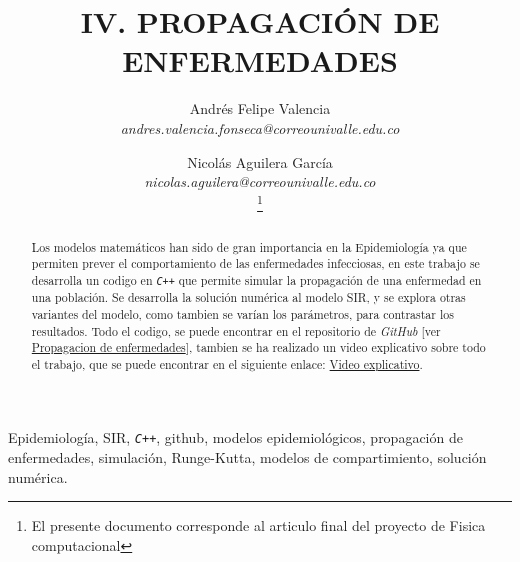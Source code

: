 \documentclass[journal]{IEEEtran}
\begin{document}
\title{IV. PROPAGACIÓN DE ENFERMEDADES}
\author{Andrés Felipe Valencia \\
	\textit{andres.valencia.fonseca@correounivalle.edu.co}\\%
	\and
	Nicolás Aguilera García \\
	\textit{nicolas.aguilera@correounivalle.edu.co}\\
	\thanks{El presente documento corresponde al articulo final del
		proyecto de Fisica computacional}} %

\maketitle

\begin{abstract}
	Los modelos matemáticos han sido de gran importancia en la Epidemiología ya que
	permiten prever el comportamiento de las enfermedades infecciosas, en este trabajo
	se desarrolla un codigo en \texttt{\textit{C++}} que permite simular la propagación
	de una enfermedad en una población. Se desarrolla la solución numérica al modelo SIR, y 
	se explora otras variantes del modelo, como tambien se varían los parámetros, para contrastar los resultados.
	Todo el codigo, se puede encontrar en el repositorio de \emph{GitHub}
	[ver \href{https://github.com/niaggar/propagacion-de-enfermedades-project}{Propagacion
	de enfermedades}], tambien se ha realizado un video explicativo sobre todo el trabajo,
	que se puede encontrar en el siguiente enlace: \href{https://youtu.be/1Z4Z4Z4Z4Z4}{Video
	explicativo}.
\end{abstract}

\begin{IEEEkeywords}
Epidemiología, SIR, \texttt{\textit{C++}}, github, modelos epidemiológicos, propagación de enfermedades,
simulación, Runge-Kutta, modelos de compartimiento, solución numérica.
\end{IEEEkeywords}
\end{document}
